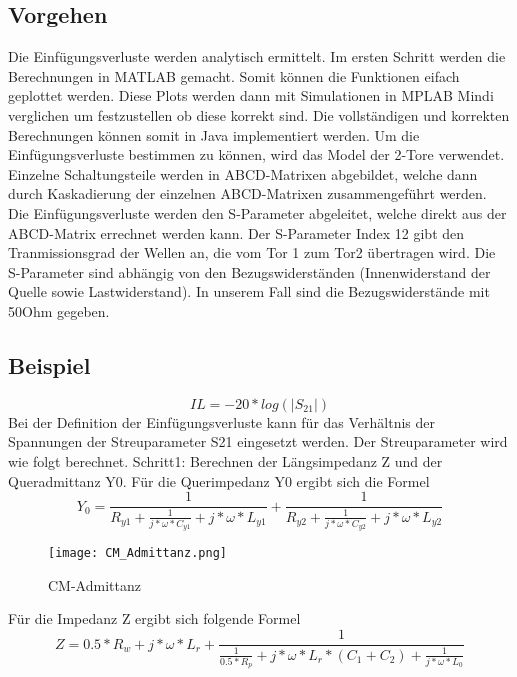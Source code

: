 \subsection{Vorgehen} \label{subsec:vorgehen}
Die Einfügungsverluste werden analytisch ermittelt. Im ersten Schritt werden die Berechnungen in MATLAB gemacht. Somit können die Funktionen eifach geplottet werden. Diese Plots werden dann mit Simulationen in MPLAB Mindi verglichen um festzustellen ob diese korrekt sind. Die vollständigen und korrekten Berechnungen können somit in Java implementiert werden. Um die Einfügungsverluste bestimmen zu können, wird das Model der 2-Tore verwendet. Einzelne Schaltungsteile werden in ABCD-Matrixen abgebildet, welche dann durch Kaskadierung der einzelnen ABCD-Matrixen zusammengeführt werden. Die Einfügungsverluste werden den S-Parameter abgeleitet, welche direkt aus der ABCD-Matrix errechnet werden kann.
Der S-Parameter Index 12 gibt den Tranmissionsgrad der Wellen an, die vom Tor 1 zum Tor2 übertragen wird. Die S-Parameter sind abhängig von den Bezugswiderständen (Innenwiderstand der Quelle sowie Lastwiderstand). In unserem Fall sind die Bezugswiderstände mit 50Ohm gegeben.

\newpage
\subsection{Beispiel} \label{subsec:beispiel}

\begin{equation}
IL= -20*log(\left\lvert S_{21} \right\rvert)
\end{equation}
Bei der Definition der Einfügungsverluste kann für das Verhältnis der Spannungen der Streuparameter S21 eingesetzt werden. Der Streuparameter wird wie folgt berechnet.
Schritt1: Berechnen der Längsimpedanz Z und der Queradmittanz Y0.
Für die Querimpedanz Y0 ergibt sich die Formel
\begin{equation}
Y_0 = \frac{ 1 }{R_{y1} + \frac{1}{j*\omega*C_{y1}}+j*\omega*L_{y1}} +\frac{ 1 }{R_{y2} + \frac{1}{j*\omega*C_{y2}}+j*\omega*L_{y2}}
\end{equation}
\begin{figure}[H]
	\centering
	\texttt{[image: CM\_Admittanz.png]}
	\caption{CM-Admittanz}
	\label{fig:CM-Admittanz}
\end{figure}
Für die Impedanz Z ergibt sich folgende Formel
\begin{equation}
Z = 0.5*R_w+j*\omega*L_r+\frac{ 1 }{ \frac{1}{0.5*R_p}+j*\omega*L_r*(C_1+C_2)+\frac{1}{j*\omega*L_0} }
\end{equation}

